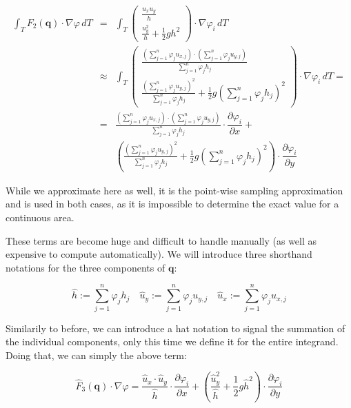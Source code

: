 \documentclass{article}
\newcommand{\pd}[2]{\dfrac{\partial #1}{\partial #2}}
\renewcommand{\phi}{\varphi}
\begin{document}
\begin{eqnarray*}
  \int_T F_2\left(\mathbf{q}\right) \cdot \nabla \phi \, dT & = &
  \int_T
  \begin{pmatrix}
    \frac{u_x u_y}{h} \\ \frac{u_y^2}{h} + \frac{1}{2} g h^2
  \end{pmatrix}
  \cdot \nabla \phi_i \, dT \\
  & \approx & \int_T
  \begin{pmatrix}
    \frac{(\sum_{j=1}^n \phi_j u_{x,j}) \cdot (\sum_{j=1}^n \phi_j u_{y,j})}{\sum_{j=1}^n \phi_j h_j} \\ \frac{(\sum_{j=1}^n \phi_j u_{y,j})^2}{\sum_{j=1}^n \phi_j h_j} + \frac{1}{2} g (\sum_{j=1}^n \phi_j h_j)^2
  \end{pmatrix}
  \cdot \nabla \phi_i \, dT = \\
  & = &
  \frac{(\sum_{j=1}^n \phi_j u_{x,j}) \cdot (\sum_{j=1}^n \phi_j u_{y,j})}{\sum_{j=1}^n \phi_j h_j} \cdot \pd{\phi_i}{x} + \\
  & & \left( \frac{(\sum_{j=1}^n \phi_j u_{y,j})^2}{\sum_{j=1}^n \phi_j h_j} + \frac{1}{2} g (\sum_{j=1}^n \phi_j h_j)^2 \right) \cdot \pd{\phi_i}{y}
\end{eqnarray*}

While we approximate here as well, it is the point-wise sampling approximation and is used in both cases, as it is impossible to determine the exact value for a continuous area.

These terms are become huge and difficult to handle manually (as well as expensive to compute automatically). We will introduce three shorthand notations for the three components of $\mathbf{q}$:

\begin{equation}
  \label{eq:substitutions-for-all-components-with-hat}
  \widehat{h} := \sum_{j=1}^n \phi_j h_j \quad
  \widehat{u}_y := \sum_{j=1}^n \phi_j u_{y,j} \quad
  \widehat{u}_x := \sum_{j=1}^n \phi_j u_{x,j}
\end{equation}

Similarily to before, we can introduce a hat notation to signal the summation of the individual components, only this time we define it for the entire integrand. Doing that, we can simply the above term:

\begin{equation}
  \label{eq:stiffness-analysis-third-line-exact-approx-simple}
  \widehat{F}_3(\mathbf{q}) \cdot \nabla \phi=
  \frac{\widehat{u}_x \cdot \widehat{u}_y }{\widehat{h}} \cdot \pd{\phi_i}{x} +
  \left( \frac{\widehat{u}_y^2}{\widehat{h}} + \frac{1}{2} g \widehat{h}^2 \right) \cdot \pd{\phi_i}{y}
\end{equation}
\end{document}
